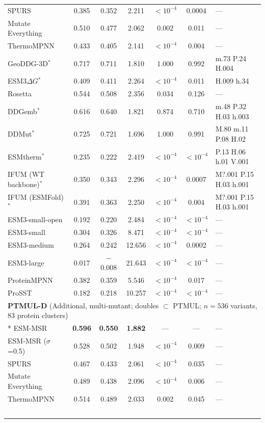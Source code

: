 {\begin{longtable}{lcccccl}
SPURS & 0.385 & 0.352 & 2.211 & $<10^{-4}$ & 0.0004 & --- \\
Mutate Everything & 0.510 & 0.477 & 2.062 & 0.002 & 0.011 & --- \\
ThermoMPNN & 0.433 & 0.405 & 2.141 & $<10^{-4}$ & 0.004 & --- \\
GeoDDG-3D$^*$ & 0.717 & 0.711 & 1.810 & 1.000 & 0.992 & m.73 P.24 H.004 \\
ESM3$\Delta G$$^*$ & 0.409 & 0.411 & 2.264 & $<10^{-4}$ & 0.011 & H.009 h.34 \\
Rosetta & 0.544 & 0.508 & 2.356 & 0.034 & 0.126 & --- \\
DDGemb$^*$ & 0.616 & 0.640 & 1.821 & 0.874 & 0.710 & m.48 P.32 H.03 h.003 \\
DDMut$^*$ & 0.725 & 0.721 & 1.696 & 1.000 & 0.991 & M.80 m.11 P.08 H.02 \\
ESMtherm$^*$ & 0.235 & 0.222 & 2.419 & $<10^{-4}$ & $<10^{-4}$ & P.13 H.06 h.01 V.001 \\
IFUM (WT backbone)$^*$ & 0.350 & 0.343 & 2.296 & $<10^{-4}$ & 0.0007 & M?.001 P.15 H.03 h.001 \\
IFUM (ESMFold)$^*$ & 0.391 & 0.363 & 2.250 & $<10^{-4}$ & 0.004 & M?.001 P.15 H.03 h.001 \\
ESM3-small-open & 0.192 & 0.220 & 2.484 & $<10^{-4}$ & $<10^{-4}$ & --- \\
ESM3-small & 0.304 & 0.326 & 8.471 & $<10^{-4}$ & $<10^{-4}$ & --- \\
ESM3-medium & 0.264 & 0.242 & 12.656 & $<10^{-4}$ & 0.0002 & --- \\
ESM3-large & 0.017 & $-$0.008 & 21.643 & $<10^{-4}$ & $<10^{-4}$ & --- \\
ProteinMPNN & 0.382 & 0.359 & 5.546 & $<10^{-4}$ & 0.017 & --- \\
ProSST & 0.182 & 0.218 & 10.257 & $<10^{-4}$ & $<10^{-4}$ & --- \\
\midrule
\multicolumn{7}{l}{\textbf{PTMUL-D} (Additional, multi-mutant; doubles $\subset$ PTMUL; $n=536$ variants, 83 protein clusters)} \\*
\midrule
ESM-MSR & \textbf{0.596} & \textbf{0.550} & \textbf{1.882} & --- & --- & --- \\
ESM-MSR ($\sigma$=0.5) & 0.528 & 0.502 & 1.948 & $<10^{-4}$ & 0.009 & --- \\
SPURS & 0.467 & 0.433 & 2.061 & $<10^{-4}$ & 0.035 & --- \\
Mutate Everything & 0.489 & 0.438 & 2.096 & $<10^{-4}$ & 0.006 & --- \\
ThermoMPNN & 0.514 & 0.489 & 2.033 & 0.002 & 0.045 & --- \\
$$
\end{longtable}}
